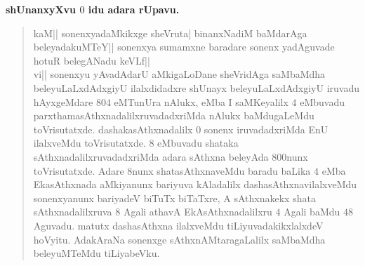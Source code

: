 \begin{center}
{\large\bf shUnanxyXvu {\boldmath$0$} idu adara rUpavu.}
\end{center}
\begin{verse}
kaM|| sonenxyadaMkikxge sheVruta| binanxNadiM baMdarAga beleyadakuMTeY|| sonenxya sumamxne baradare sonenx yadAguvade hotuR belegANadu keVLf||\\

vi|| sonenxyu yAvadAdarU aMkigaLoDane sheVridAga saMbaMdha beleyuLaLxdAdxgiyU ilalxdidadxre shUnayx beleyuLaLxdAdxgiyU iruvadu hAyxgeMdare $804$ eMTunUra nAlukx, eMba I saMKeyalilx $4$ eMbuvadu parxthamasAthxnadalilxruvadadxriMda nAlukx baMdugaLeMdu toVrisutatxde. dashakasAthxnadalilx $0$ sonenx iruvadadxriMda EnU ilalxveMdu toVrisutatxde. $8$ eMbuvadu shataka sAthxnadalilxruvadadxriMda adara sAthxna beleyAda $800$nunx toVrisutatxde. Adare $8$nunx shatasAthxnaveMdu baradu baLika $4$ eMba EkasAthxnada aMkiyanunx bariyuva kAladalilx dashasAthxnavilalxveMdu sonenxyanunx bariyadeV biTuTx biTaTxre, A sAthxnakekx shata sAthxnadalilxruva $8$ Agali athavA EkAsAthxnadalilxru $4$ Agali baMdu $48$ Aguvadu. matutx dashasAthxna ilalxveMdu tiLiyuvadakikxlalxdeV hoVyitu. AdakAraNa sonenxge sAthxnAMtaragaLalilx saMbaMdha beleyuMTeMdu tiLiyabeVku.
\end{verse}
